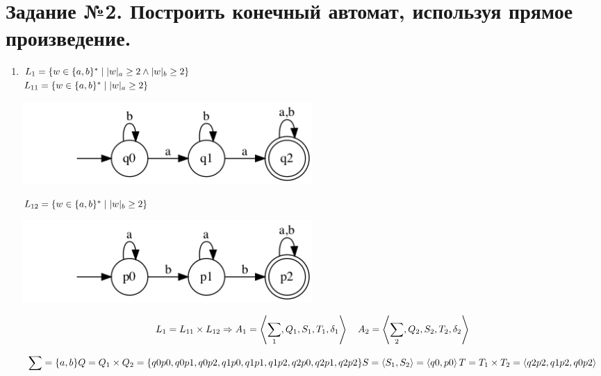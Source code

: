 \documentclass{article}
\begin{document}
\section{Задание №2. Построить конечный автомат, используя прямое произведение.}
\begin{enumerate}
\\
\item {$L_1 = \{ w \in \{a,b\}^*   \mid  |w|_a \ge 2  \wedge   |w|_b \ge 2 \} \\ $} \\
    $L_{11} = \{ w \in \{a,b\}^*   \mid   |w|_a \ge 2 \} \\$
    \begin{center}
        \includegraphics[width=0.5\textwidth]{g211.png}
    \end{center}

    $L_{12} = \{ w \in \{a,b\}^*   \mid   |w|_b \ge 2 \} \\$
    \begin{center}
        \includegraphics[width=0.5\textwidth]{g212.png}
    \end{center}
    
    \begin{center}
    \[
        L_1 = L_{11} \times L_{12} \Rightarrow \\
        A_1 = \left\langle \sum_{1} , Q_1, S_1, T_1, \delta_1\right\rangle \quad 
        A_2 = \left\langle \sum_{2}, Q_2, S_2, T_2, \delta_2\right\rangle
    \]
    
    \[
        \sum = \{a, b\} \\
        Q = Q_1 \times Q_2 = \{q0p0, q0p1, q0p2, q1p0, q1p1, q1p2, q2p0, q2p1, q2p2\} \\
        S = \left\langle S_1, S_2 \right\rangle = \left\langle q0,p0 \right\rangle \\
        T = T_1 \times T_2 = \left\langle q2p2, q1p2, q0p2 \right\rangle
    \]
    \end{center}
    
    
    

\end{enumerate}
\end{document}
